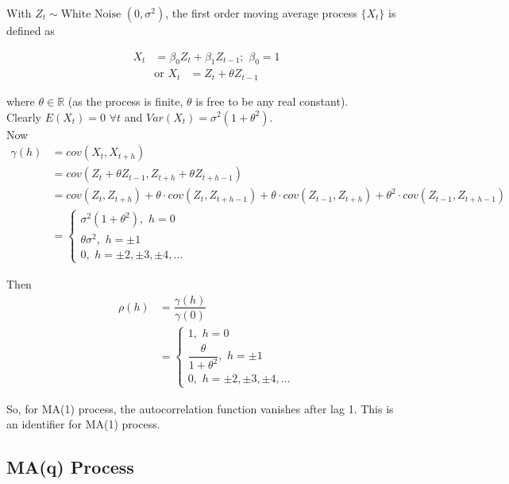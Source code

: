 \documentclass[11pt, a4paper]{article}
\numberwithin{equation}{section}
\theoremstyle{definition}
\begin{document}
With $Z_t \sim \text{White Noise }(0, \sigma^2)$, the first order moving average process $\{X_t\}$ is defined as

\begin{align}
X_t &= \beta_0 Z_t + \beta_1 Z_{t-1}; \,\, \beta_0 = 1
\end{align}
\begin{align}\label{ma1thetarepresentation}
\text{or } X_t &= Z_t + \theta Z_{t-1}
\end{align}

where $\theta \in \mathbb{R}$ (as the process is finite, $\theta$ is free to be any real constant).\\


Clearly $E(X_t) = 0$ $\forall t$ and $Var(X_t) = \sigma^2 (1 + \theta^2)$. \\[0.25em]

Now 
\begin{align*}
\gamma(h) &= cov(X_t, X_{t+h}) \\[0.25em]
&= cov(Z_t + \theta Z_{t-1}, Z_{t+h} + \theta Z_{t+h-1}) \\[0.25em]
&= cov(Z_t, Z_{t+h}) + \theta \cdot cov(Z_t, Z_{t+h-1}) + \theta \cdot  cov(Z_{t-1}, Z_{t+h}) + \theta^2 \cdot cov(Z_{t-1}, Z_{t+h-1}) \\[0.25em]
&= \begin{cases}
\sigma^2 (1 + \theta^2), \,\, h = 0 \\[0.25em]
\theta \sigma^2 , \,\, h = \pm 1 \\[0.25em]
0, \,\, h = \pm 2, \pm 3, \pm 4, \ldots
\end{cases}
\end{align*}

Then
\begin{align*}
\rho(h) &= \dfrac{\gamma(h)}{\gamma(0)} \\[0.35em]
&= \begin{cases}
1, \,\, h = 0 \\[0.25em]
\dfrac{\theta}{1 + \theta^2}, \,\, h = \pm 1 \\[0.5em]
0, \,\, h = \pm 2, \pm 3, \pm 4, \ldots
\end{cases}
\end{align*}

\smallpencil \hspace{0.1cm} So, for MA(1) process, the autocorrelation function vanishes after lag 1. This is an identifier for MA(1) process.

\subsection{MA(q) Process}
\end{document}
